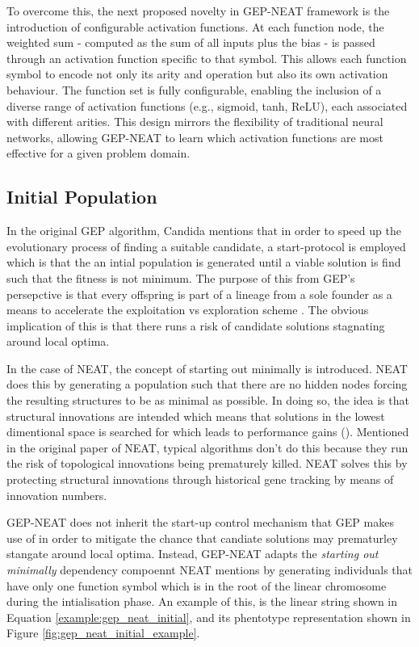 \parbreak\noindent To overcome this, the next proposed novelty in GEP-NEAT framework is the introduction of configurable activation functions. At each function node, the weighted sum - computed as the sum of all inputs plus the bias - is passed through an activation function specific to that symbol. This allows each function symbol to encode not only its arity and operation but also its own activation behaviour. The function set is fully configurable, enabling the inclusion of a diverse range of activation functions (e.g., sigmoid, tanh, ReLU), each associated with different arities. This design mirrors the flexibility of traditional neural networks, allowing GEP-NEAT to learn which activation functions are most effective for a given problem domain.

\subsection{Initial Population}
In the original GEP algorithm, Candida mentions that in order to speed up the evolutionary process of finding a suitable candidate, a start-protocol is employed which is that the an intial population is generated until a viable solution is find such that the fitness is not minimum. The purpose of this from GEP's persepctive is that every offspring is part of a lineage from a sole founder as a means to accelerate the exploitation vs exploration scheme \cite{ferreira2006gene}. The obvious implication of this is that there runs a risk of candidate solutions stagnating around local optima. \bigskip

\noindent In the case of NEAT, the concept of starting out minimally is introduced. NEAT does this by generating a population such that there are no hidden nodes forcing the resulting structures to be as minimal as possible. In doing so, the idea is that structural innovations are intended which means that solutions in the lowest dimentional space is searched for which leads to performance gains (\cite{stanley2002evolving}). Mentioned in the original paper of NEAT, typical algorithms don't do this because they run the risk of topological innovations being prematurely killed. NEAT solves this by protecting structural innovations through historical gene tracking by means of innovation numbers. \bigskip

\noindent GEP-NEAT does not inherit the start-up control mechanism that GEP makes use of in order to mitigate the chance that candiate solutions may prematurley stangate around local optima. Instead, GEP-NEAT adapts the \textit{starting out minimally} dependency compoennt NEAT mentions by generating individuals that have only one function symbol which is in the root of the linear chromosome during the intialisation phase. An example of this, is the linear string shown in Equation \ref{example:gep_neat_initial}, and its phentotype representation shown in Figure \ref{fig:gep_neat_initial_example}.

